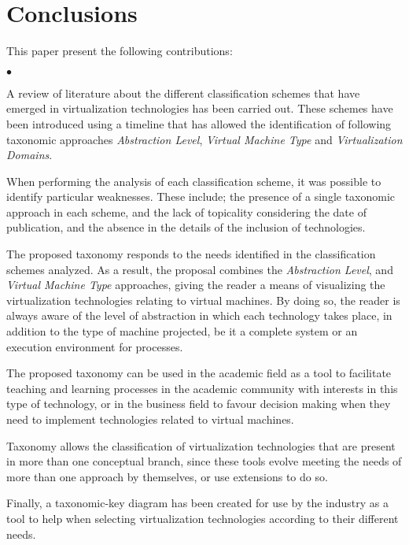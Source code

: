 	\section {Conclusions}\label{sec:conclusion}
	
	This paper present the following contributions:  
	
	\begin{list}{$\bullet$}{\setlength{\leftmargin}{5pt}}
	
	    \item A review of literature about the different classification schemes that have emerged in virtualization technologies has been carried out. These schemes have been introduced using a timeline that has allowed the identification of following taxonomic approaches \textit{Abstraction Level}, \textit{Virtual Machine Type} and \textit{Virtualization Domains}.
		
		\item When performing the analysis of each classification scheme, it was possible to identify particular weaknesses. These include; the presence of a single taxonomic approach in each scheme, and the lack of topicality considering the date of publication, and the absence in the details of the inclusion of technologies.
		
		\item The proposed taxonomy responds to the needs identified in the classification schemes analyzed. As a result, the proposal combines the \textit{Abstraction Level}, and \textit{Virtual Machine Type} approaches, giving the reader a means of visualizing the virtualization technologies relating to virtual machines. By doing so, the reader is always aware of the level of abstraction in which each technology takes place, in addition to the type of machine projected, be it a complete system or an execution environment for processes.
		
		\item The proposed taxonomy can be used in the academic field as a tool to facilitate teaching and learning processes in the academic community with interests in this type of technology, or in the business field to favour decision making when they need to implement technologies related to virtual machines. 
		
		\item Taxonomy allows the classification of virtualization technologies that are present in more than one conceptual branch, since these tools evolve meeting the needs of more than one approach by themselves, or use extensions to do so.
		
		\item Finally, a taxonomic-key diagram has been created for use by the industry as a tool to help when selecting virtualization technologies according to their different needs.

	\end{list}
